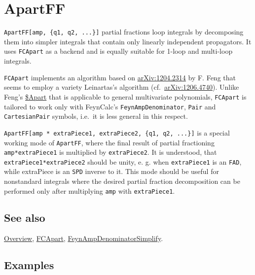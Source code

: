 \documentclass[../FeynCalcManual.tex]{subfiles}
\begin{document}
\hypertarget{apartff}{
\section{ApartFF}\label{apartff}}

\texttt{ApartFF[\allowbreak{}amp,\ \allowbreak{}\{\allowbreak{}q1,\ \allowbreak{}q2,\ \allowbreak{}...\}]}
partial fractions loop integrals by decomposing them into simpler
integrals that contain only linearly independent propagators. It uses
\texttt{FCApart} as a backend and is equally suitable for 1-loop and
multi-loop integrals.

\texttt{FCApart} implements an algorithm based on
\href{https://arxiv.org/abs/1204.2314}{arXiv:1204.2314} by F. Feng that
seems to employ a variety Leinartas's algorithm
(cf.~\href{https://arxiv.org/abs/1206.4740}{arXiv:1206.4740}). Unlike
Feng's \href{https://github.com/F-Feng/APart}{\$Apart} that is
applicable to general multivariate polynomials, \texttt{FCApart} is
tailored to work only with FeynCalc's \texttt{FeynAmpDenominator},
\texttt{Pair} and \texttt{CartesianPair} symbols, i.e.~it is less
general in this respect.

\texttt{ApartFF[\allowbreak{}amp * extraPiece1,\ \allowbreak{}extraPiece2,\ \allowbreak{}\{\allowbreak{}q1,\ \allowbreak{}q2,\ \allowbreak{}...\}]}
is a special working mode of \texttt{ApartFF}, where the final result of
partial fractioning \texttt{amp*extraPiece1} is multiplied by
\texttt{extraPiece2}. It is understood, that
\texttt{extraPiece1*extraPiece2} should be unity, e. g. when
\texttt{extraPiece1} is an \texttt{FAD}, while extraPiece is an
\texttt{SPD} inverse to it. This mode should be useful for nonstandard
integrals where the desired partial fraction decomposition can be
performed only after multiplying \texttt{amp} with \texttt{extraPiece1}.

\subsection{See also}

\hyperlink{toc}{Overview}, \hyperlink{fcapart}{FCApart},
\hyperlink{feynampdenominatorsimplify}{FeynAmpDenominatorSimplify}.

\subsection{Examples}

\begin{Shaded}
\begin{Highlighting}[]
\OperatorTok{[]}
\end{Highlighting}
\end{Shaded}
\end{document}
